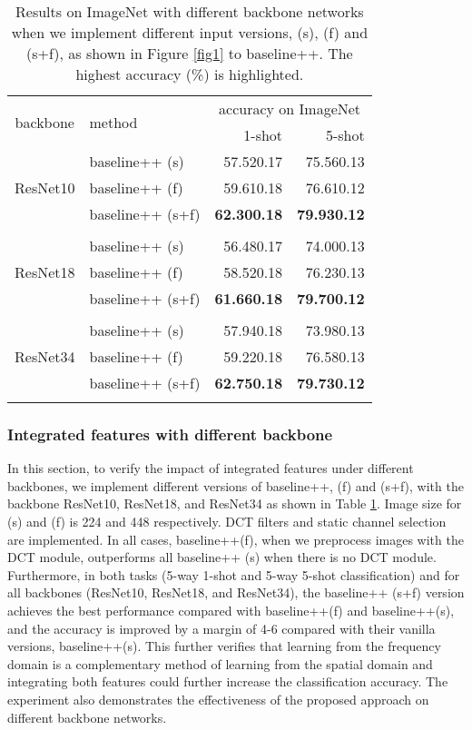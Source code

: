 \documentclass[10pt, conference, compsocconf]{IEEEtran}
\begin{document}
\begin{table}[t]
\centering
\caption{Results on ImageNet with different backbone networks when we implement different input versions, (s), (f) and (s+f), as shown in Figure \ref{fig1} to baseline++. The highest accuracy (\%) is highlighted.}
\begin{tabular}{c|l|rr}
\toprule
\multirow{2}{*}{backbone} & \multirow{2}{*}{method} & \multicolumn{2}{c}{accuracy on ImageNet} \\
& &1-shot&  5-shot\\ \hline
\multirow{3}{*}{ResNet10} 
& baseline++ (s) &  57.520.17 & 75.560.13 \\
& baseline++ (f) &  59.610.18 & 76.610.12 \\ 
& baseline++ (s+f) & {}{\bf{62.300.18}} & {}{\bf{79.930.12}}\\
&  & {}{}&  {}{} \\ \hline
\multirow{3}{*}{ResNet18}  & baseline++ (s) & 56.480.17 & 74.000.13 \\
& baseline++ (f)  & 58.520.18 & 76.230.13 \\
& baseline++ (s+f)  & {}{\bf{61.660.18}} & {}{\bf{79.700.12}} \\
&  & {}{}&  {}{} \\ \hline
\multirow{3}{*}{ResNet34} & baseline++ (s) & 57.940.18 & 73.980.13 \\
& baseline++ (f)  & 59.220.18 & 76.580.13 \\
& baseline++ (s+f) & {}{\bf{62.750.18}} & {}{\bf{79.730.12}} \\
&  & {}{}&  {}{} \\
\bottomrule
\end{tabular}
\label{table4}
\end{table}



\subsubsection{Integrated features with different backbone}

In this section, to verify the impact of integrated features under different backbones, we implement different versions of baseline++, (f) and (s+f), with the backbone ResNet10, ResNet18, and ResNet34 as shown in Table \ref{table4}. Image size for (s) and (f) is 224 and 448 respectively.  DCT filters and static channel selection are implemented. In all cases, baseline++(f), when we preprocess images with the DCT module, outperforms all baseline++ (s) when there is no DCT module. Furthermore, in both tasks (5-way 1-shot and 5-way 5-shot classification) and for all backbones (ResNet10, ResNet18, and ResNet34), the baseline++ (s+f) version achieves the best performance compared with baseline++(f) and baseline++(s), and the accuracy is improved by a margin of 4-6 compared with their vanilla versions, baseline++(s).  This further verifies that learning from the frequency domain is a complementary method of learning from the spatial domain and integrating both features could further increase the classification accuracy. The experiment also demonstrates the effectiveness of the proposed approach on different backbone networks.
\end{document}
